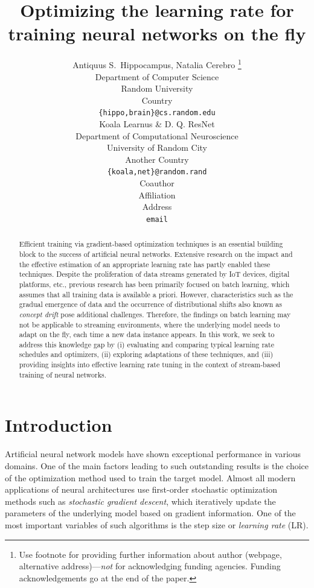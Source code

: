 \documentclass{article} %
\title{Optimizing the learning rate for training neural networks on the fly}
\author{Antiquus S.~Hippocampus, Natalia Cerebro  \thanks{ Use footnote for providing further information
about author (webpage, alternative address)---\emph{not} for acknowledging
funding agencies.  Funding acknowledgements go at the end of the paper.} \\
Department of Computer Science\\
Random University\\
Country \\
\texttt{\{hippo,brain\}@cs.random.edu} \\
\And %
Koala Learnus \& D. Q. ResNet  \\
Department of Computational Neuroscience \\
University of Random City \\
Another Country \\
\texttt{\{koala,net\}@random.rand} \\
\AND %
Coauthor \\
Affiliation \\
Address \\
\texttt{email}
}
\begin{document}
\maketitle

\begin{abstract}
   Efficient training via gradient-based optimization techniques is an essential building block to the success of artificial neural networks. Extensive research on the impact and the effective estimation of an appropriate learning rate has partly enabled these techniques. Despite the proliferation of data streams generated by IoT devices, digital platforms, etc., previous research has been primarily focused on batch learning, which assumes that all training data is available a priori. However, characteristics such as the gradual emergence of data and the occurrence of distributional shifts also known as \textit{concept drift} pose additional challenges. Therefore, the findings on batch learning may not be applicable to streaming environments, where the underlying model needs to adapt on the fly, each time a new data instance appears. In this work, we seek to address this knowledge gap by (i) evaluating and comparing typical learning rate schedules and optimizers, (ii) exploring adaptations of these techniques, and (iii) providing insights into effective learning rate tuning in the context of stream-based training of neural networks.
\end{abstract}

\section{Introduction}
Artificial neural network models have shown exceptional performance in various domains.
One of the main factors leading to such outstanding results is the choice of the optimization method used to train the target model.
Almost all modern applications of neural architectures use first-order stochastic optimization methods such as \textit{stochastic gradient descent}, which iteratively update the parameters of the underlying model based on gradient information.
One of the most important variables of such algorithms is the step size or \textit{learning rate} (LR).
\end{document}
